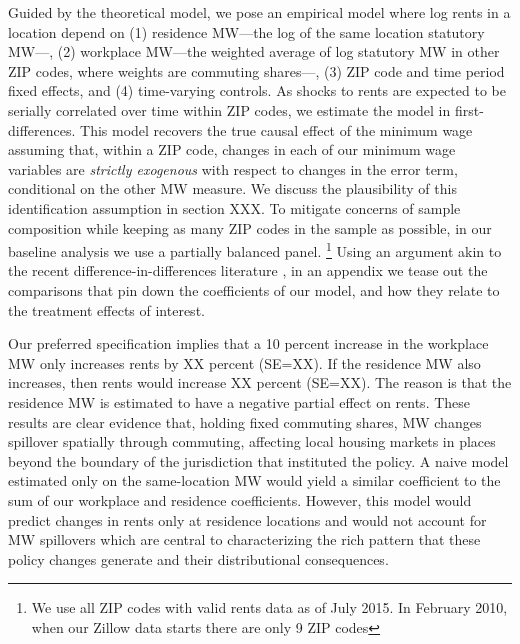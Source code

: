 Guided by the theoretical model, we pose an empirical model where log rents in 
a location depend on
(1) residence MW---the log of the same location statutory MW---,
(2) workplace MW---the weighted average of log statutory MW in other ZIP codes,
where weights are commuting shares---,
(3)  ZIP code and time period fixed effects,
and 
(4) time-varying controls.
As shocks to rents are expected to be serially correlated over time within ZIP codes, 
we estimate the model in first-differences.
This model recovers the true causal effect of the minimum wage assuming that, 
within a ZIP code, changes in each of our minimum wage variables are 
\textit{strictly exogenous} with respect to changes in the error term, conditional
on the other MW measure. We discuss the plausibility of this identification assumption
in section XXX.
To mitigate concerns of sample composition while keeping as many ZIP codes in the 
sample as possible, in our baseline analysis we use a partially balanced panel.%
\footnote{We use all ZIP codes with valid rents data
as of July 2015. In February 2010, when our Zillow data starts there are only 9 ZIP codes}
Using an argument akin to the recent difference-in-differences literature
\parencite[e.g.,][]{CallawaySantAnna2021,CallawayEtAl2021}, 
in an appendix we tease out the comparisons that pin down the coefficients of our 
model, and how they relate to the treatment effects of interest.


Our preferred specification implies that a 10 percent increase in the workplace MW
only increases rents by XX percent (SE=XX).
If the residence MW also increases, then rents would increase XX percent (SE=XX).
The reason is that the residence MW is estimated to have a negative partial effect
on rents.
These results are clear evidence that, holding fixed commuting shares, MW changes 
spillover spatially through commuting, affecting local housing markets in places
beyond the boundary of the jurisdiction that instituted the policy.
A naive model estimated only on the same-location MW would yield a similar coefficient
to the sum of our workplace and residence coefficients.
However, this model would predict changes in rents only at residence locations and 
would not account for MW spillovers which are central to characterizing the rich pattern
that these policy changes generate and their distributional consequences. 


